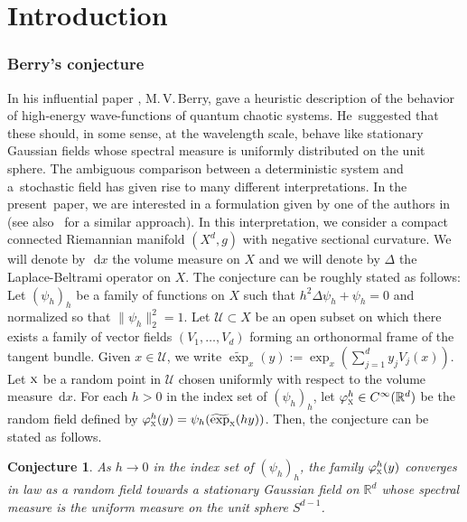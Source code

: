 \documentclass[JEP,XML,SOM,Unicode,published]{cedram}
\let\mathcal\mathscr
\newcommand{\rd}{\,\mathrm{d}}
\theoremstyle{plain}
\newtheorem*{conjecture}{Conjecture}
\theoremstyle{definition}
\newcommand{\R}{\mathbb{R}}
\begin{document}
\maketitle
\vspace*{-\baselineskip}\enlargethispage{.5\baselineskip}
\tableofcontents


\section{Introduction}

\subsubsection*{Berry's conjecture}

In his influential paper \cite{Ber}, M.\,V.\,Berry, gave a heuristic descrip\-tion of the behavior of high-energy wave-functions of quantum chaotic systems. He~suggested that these should, in some sense, at the wavelength scale, behave like stationary Gaussian fields whose spectral measure is uniformly distributed on the unit sphere. The ambiguous comparison between a deterministic system and a~stochastic field has given rise to many different interpretations. In the present~paper, we are interested in a formulation given by one of the authors in \cite{LWL} (see also~\cite{ABLM} for a similar approach). In this interpretation, we consider a compact connected Riemannian manifold $(X^d,g)$ with negative sectional curvature. We will denote by~$\rd x$ the volume measure on $X$ and we will denote by $\Delta$ the Laplace-Beltrami operator on $X$. The conjecture can be roughly stated as follows: Let $(\psi_h)_h$ be a family of functions on $X$ such that $h^2\Delta\psi_h+\psi_h=0$ and normalized so that $\|\psi_h\|_2^2=1$. Let $\mathcal{U}\subset X$ be an open subset on which there exists a family of vector fields $(V_1,\dots,V_d)$ forming an orthonormal frame of the tangent bundle. Given $x\in \mathcal{U}$, we write $\widetilde{\exp}_x(y):=\exp_x(\sum_{j=1}^d y_jV_j(x))$. Let $\textsc{x}$ be a random point in $\mathcal{U}$ chosen uniformly with respect to the volume measure $\rd x$. For each $h>0$ in the index set of $(\psi_h)_h$, let $\varphi_{\textsc{x}}^h\in C^\infty(\R^d)$ be the random field defined by $\varphi_{\textsc{x}}^h(y)=\psi_h(\widetilde{\exp}_{\textsc{x}}(hy))$. Then, the conjecture can be stated as follows.\enlargethispage{.5\baselineskip}%

\begin{conjecture}
As $h\to 0$ in the index set of $(\psi_h)_h$, the family $\varphi_{\textsc{x}}^h(y)$ converges in law as a random field towards a stationary Gaussian field on $\R^d$ whose spectral measure is the uniform measure on the unit sphere $S^{d-1}$.
\end{conjecture}
\end{document}
